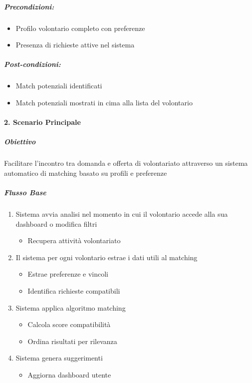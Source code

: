 \subparagraph*{Precondizioni:}
\begin{itemize}
    \item Profilo volontario completo con preferenze
    \item Presenza di richieste attive nel sistema
\end{itemize}

\subparagraph*{Post-condizioni:}
\begin{itemize}
    \item Match potenziali identificati
    \item Match potenziali mostrati in cima alla lista del volontario
\end{itemize}

\paragraph{2. Scenario Principale}
\subparagraph*{Obiettivo}
Facilitare l'incontro tra domanda e offerta di volontariato attraverso un sistema automatico di matching basato su profili e preferenze

\subparagraph*{Flusso Base}
\begin{enumerate}
    \item Sistema avvia analisi nel momento in cui il volontario accede alla sua dashboard o modifica filtri
    \begin{itemize}
        \item Recupera attività volontariato
    \end{itemize}
    \item Il sistema per ogni volontario estrae i dati utili al matching
    \begin{itemize}
        \item Estrae preferenze e vincoli
        \item Identifica richieste compatibili
    \end{itemize}
    \item Sistema applica algoritmo matching
    \begin{itemize}
        \item Calcola score compatibilità
        \item Ordina risultati per rilevanza
    \end{itemize}
    \item Sistema genera suggerimenti
    \begin{itemize}
        \item Aggiorna dashboard utente
    \end{itemize}
\end{enumerate}


